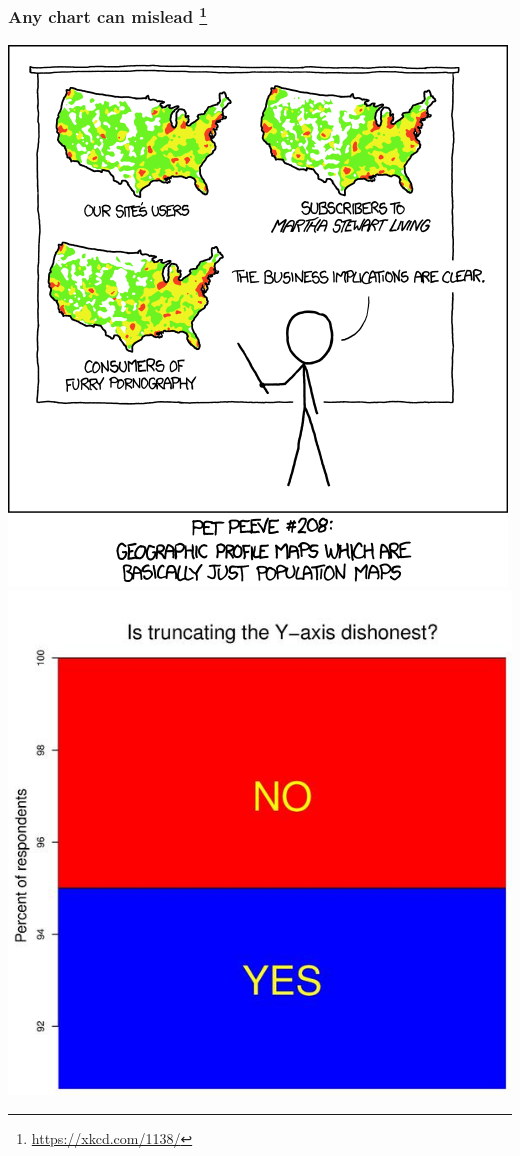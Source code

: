\begin{frame}
  \frametitle{Any chart can mislead
    \footnote{\tiny{\href{https://xkcd.com/1138/}{https://xkcd.com/1138/}}}
  }
  \begin{center}
    \includegraphics[height=0.6\textheight,valign=t]{images/heatmap}    
    \includegraphics[height=0.6\textheight,valign=t]{images/truncated_y}        
  \end{center}
\end{frame}